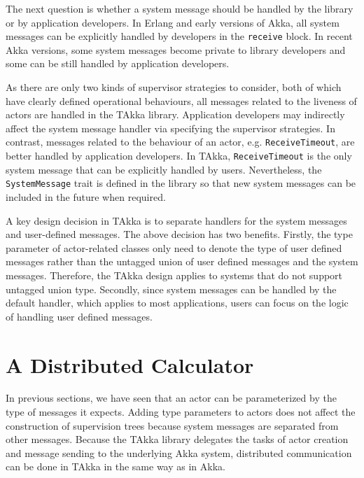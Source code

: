 The next question is whether a system message should be handled by the library 
or by application developers.  In Erlang and early versions of Akka, all
system messages can be explicitly handled by developers in the {\tt receive}
block.  In recent Akka versions, some system messages become private to library 
developers and some can be still handled by application developers.

As there are only two kinds of supervisor strategies to
consider, both of which have clearly defined operational behaviours, all
messages related to the liveness of actors are handled in the TAkka library. 
Application developers may indirectly affect the system message handler via 
specifying
the supervisor strategies. In contrast, messages related to the behaviour of an
actor, e.g. {\tt ReceiveTimeout}, are better handled by application
developers. In TAkka, {\tt ReceiveTimeout} is the only system message that can
be explicitly handled by users.  Nevertheless, the {\tt SystemMessage}
trait is defined in the library so that new system messages can be included in 
the future when required.

A key design decision in TAkka is to separate handlers for the system messages 
and user-defined messages.  The above decision has two benefits. Firstly,
the type parameter of actor-related classes only need to denote
the type of user defined messages rather than the untagged union of user 
defined messages and the system messages.  Therefore, the TAkka design applies
to systems that do not support untagged union type.  Secondly, since 
system messages can be handled by the default handler, which applies
to most applications, users can focus on the logic of handling user
defined messages.







\section{A Distributed Calculator}
\label{sec_distributed_calculator}

In previous sections, we have seen that an actor can be parameterized by the 
type of messages it expects.  Adding type parameters to actors does not affect 
the construction of supervision trees because system messages are separated 
from other messages.  Because the TAkka library delegates the tasks of actor 
creation and message sending to the underlying Akka system, distributed 
communication can be done in TAkka in the same way as in Akka.  

